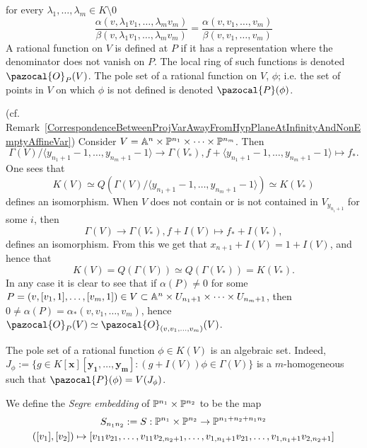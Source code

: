        for every $\lambda_1,\dots,\lambda_m\in K\setminus 0$
        $$\frac{\alpha(v,\lambda_1v_1,\dots,\lambda_mv_m)}{\beta(v,\lambda_1v_1,\dots,\lambda_mv_m)}=\frac{\alpha(v,v_1,\dots,v_m)}{\beta(v,v_1,\dots,v_m)}$$
        A rational function on $V$ is defined at $P$ if it has a representation where the denominator does not vanish on $P$. The local ring of such functions is denoted $\pazocal{O}_P(V)$. The pole set of a rational function on $V$, $\phi$; i.e. the set of points in $V$ on which $\phi$ is not defined is denoted $\pazocal{P}(\phi)$.  
        \begin{remark}
            (cf. Remark~\ref{CorrespondenceBetweenProjVarAwayFromHypPlaneAtInfinityAndNonEmptyAffineVar})        
            Consider $V= \mathbb{A}^n\times \mathbb{P}^{n_1}\times\cdots \times \mathbb{P}^{n_m}$. Then 
            $$\Gamma(V)/\langle y_{n_1+1}-1,\dots,y_{n_m+1}-1\rangle \rightarrow \Gamma(V_\ast), f+ \langle y_{n_1+1}-1,\dots,y_{n_m+1}-1\rangle \mapsto  f_\ast.$$
            One sees that 
            $$K(V)\simeq Q(\Gamma(V)/\langle y_{n_1+1}-1,\dots,y_{n_m+1}-1\rangle)\simeq K(V_\ast)$$
            defines an isomorphism. When $V$ does not contain or is not contained in $V_{y_{n_i+1}}$ for some $i$, then 
            $$\Gamma(V)\rightarrow \Gamma(V_\ast), f+ I(V)\mapsto f_\ast + I(V_\ast),$$
            defines an isomorphism. From this we get that $x_{n+1} + I(V) = 1 + I(V)$, and hence that 
            $$K(V) = Q(\Gamma(V))\simeq Q(\Gamma(V_\ast))=K(V_\ast).$$
            In any case it is clear to see that if $\alpha(P) \neq 0$ for some $P=(v,[v_1,1],\dots, [v_m,1])\in V\subset \mathbb{A}^n\times U_{n_1+1}\times \cdots\times U_{n_m+1}$, then $0\neq \alpha(P)=\alpha_\ast(v,v_1,\dots,v_m)$, hence $\pazocal{O}_P(V)\simeq \pazocal{O}_{(v,v_1,\dots,v_m)}(V)$. 
        \end{remark}
        \begin{remark}
            The pole set of a rational function $\phi\in K(V)$ is an algebraic set. Indeed, $J_\phi := \{ g\in K[\mathbf{x}][\mathbf{y_1},\dots,\mathbf{y_m}] : (g+I(V))\phi\in \Gamma(V)\}$ is a $m$-homogeneous such that $\pazocal{P}(\phi)=V(J_\phi)$. 
        \end{remark}
        \begin{definition}
            We define the \textit{Segre embedding} of $\mathbb{P}^{n_1}\times\mathbb{P}^{n_2}$ to be the map 
            \begin{gather*}
                S_{n_1n_2}:=S:\mathbb{P}^{n_1}\times \mathbb{P}^{n_2}\rightarrow \mathbb{P}^{n_1+n_2+n_1n_2}\\
                ([v_1],[v_2])\mapsto [v_{11}v_{21},\dots, v_{11}v_{2,n_2+1},\dots, v_{1,n_1+1}v_{21},\dots,v_{1,n_1+1}v_{2,n_2+1}] 
            \end{gather*}
        \end{definition}
